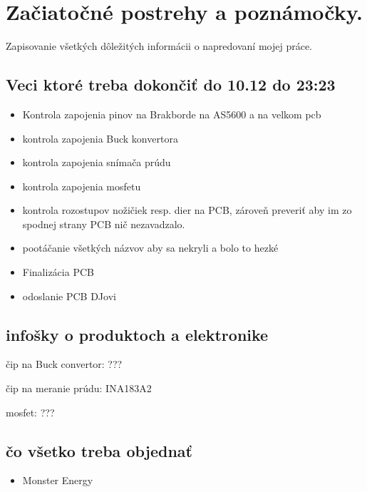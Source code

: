 \chapter{Začiatočné postrehy a poznámočky.}
\label{začiatok}


Zapisovanie všetkých dôležitých informácii o napredovaní mojej práce. 


\section{Veci ktoré treba dokončiť do 10.12 do 23:23}

\begin{itemize}
\item Kontrola zapojenia pinov na Brakborde na AS5600 a na velkom pcb
\item kontrola zapojenia Buck konvertora 
\item kontrola zapojenia snímača prúdu 
\item kontrola zapojenia mosfetu
\item kontrola rozostupov nožičiek resp. dier na PCB, zároveň preveriť aby im zo spodnej strany PCB nič nezavadzalo. 
\item pootáčanie všetkých názvov aby sa nekryli a bolo to hezké 
\item Finalizácia PCB
\item odoslanie PCB DJovi
\end{itemize}

\section{infošky o produktoch a elektronike}

čip na Buck convertor: ??? \cite{BUCK2021}

čip na meranie prúdu: INA183A2 \cite{INA2021}

mosfet: ??? \cite{MOSFET2021}


\section{čo všetko treba objednať}

\begin{itemize}
\item Monster Energy
\end{itemize}